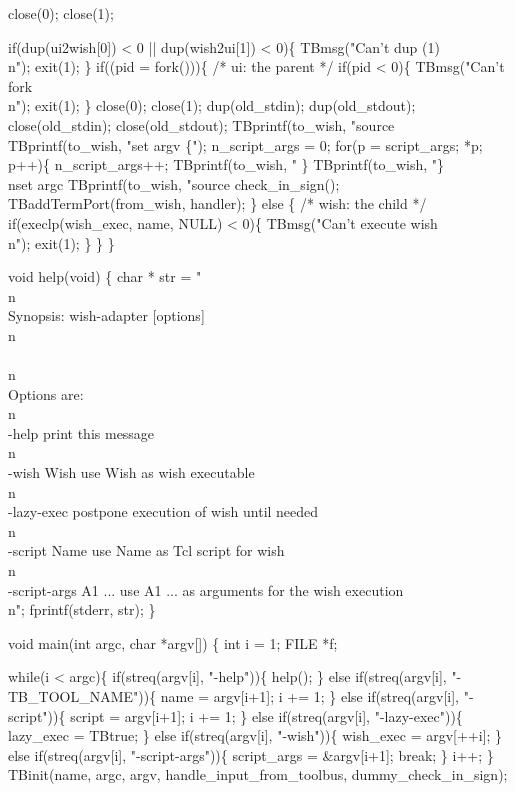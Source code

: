   close(0); close(1);

  if(dup(ui2wish[0]) < 0 || dup(wish2ui[1]) < 0)\{
    TBmsg("Can't dup (1)\\n"); exit(1);
  \}
  if((pid = fork()))\{
    /* ui: the parent */
    if(pid < 0)\{
      TBmsg("Can't fork\\n"); exit(1);
    \}
    close(0); close(1);
    dup(old_stdin);
    dup(old_stdout);
    close(old_stdin);
    close(old_stdout);
    TBprintf(to_wish, "source %
    TBprintf(to_wish, "set argv \{");
    n_script_args = 0;
    for(p = script_args; *p; p++)\{
      n_script_args++;   
      TBprintf(to_wish, "%
    \}  
    TBprintf(to_wish, "\}\\nset argc %
    TBprintf(to_wish, "source %
    check_in_sign();
    TBaddTermPort(from_wish, handler);
  \} else \{
    /* wish: the child */
    if(execlp(wish_exec, name, NULL) < 0)\{
      TBmsg("Can't execute wish\\n");
      exit(1);
    \}
  \}
\}

void help(void)
\{
  char * str =
"\\n\\
Synopsis: wish-adapter [options]\\n\\
\\n\\
Options are:\\n\\
-help                 print this message\\n\\
-wish Wish            use Wish as wish executable\\n\\
-lazy-exec            postpone execution of wish until needed\\n\\
-script Name          use Name as Tcl script for wish\\n\\
-script-args A1 ...   use A1 ... as arguments for the wish execution\\n";
  fprintf(stderr, str);
\}

void main(int argc, char *argv[])
\{
  int i = 1;
  FILE *f;

  while(i < argc)\{
    if(streq(argv[i], "-help"))\{
      help();
    \} else if(streq(argv[i], "-TB_TOOL_NAME"))\{
      name = argv[i+1]; i += 1;
    \} else if(streq(argv[i], "-script"))\{
      script = argv[i+1]; i += 1;
    \} else if(streq(argv[i], "-lazy-exec"))\{
      lazy_exec = TBtrue;
    \} else if(streq(argv[i], "-wish"))\{
      wish_exec = argv[++i];
    \} else if(streq(argv[i], "-script-args"))\{
      script_args = &argv[i+1];
      break;
    \}
    i++;
  \}
  TBinit(name, argc, argv, handle_input_from_toolbus, dummy_check_in_sign);

